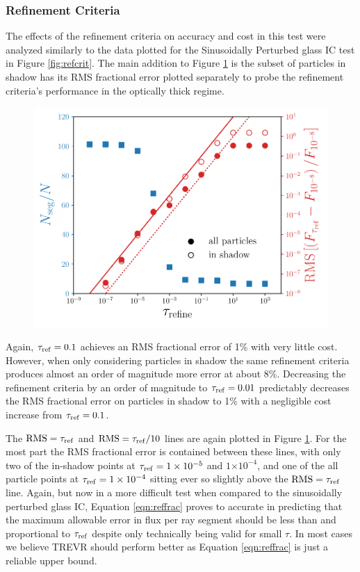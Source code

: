 \documentclass[fleq,usenatbib]{mnras}
\newcommand{\acro}{TREVR}
\providecommand{\e}[1]{\ensuremath{\times10^{#1}}}
\newcommand{\tr}{\tau_{\rm ref}}
\begin{document}
\subsubsection{Refinement Criteria}
The effects of the refinement criteria on accuracy and cost in this test were 
analyzed similarly to the data plotted for the Sinusoidally Perturbed glass IC 
test in Figure \ref{fig:refcrit}. The main addition to Figure \ref{fig:isosph} 
is the subset of particles in shadow has its RMS fractional error plotted 
separately to probe the refinement criteria's performance in the optically 
thick regime.
\begin{figure}
\includegraphics[width=1\linewidth]{Figures/isothermal_spheres.pdf}
\caption{}
\label{fig:isosph}
\end{figure}
Again, $\tr=0.1$ achieves an RMS fractional error of 1\% with very 
little cost. However, when only considering particles in shadow the same 
refinement criteria produces almost an order of magnitude more error at about 
8\%. Decreasing the refinement criteria by an order of magnitude to 
$\tr=0.01$ predictably decreases the RMS fractional error on particles in 
shadow to 1\% with a negligible cost increase from $\tr=0.1$. 

The $\rm{RMS}=\tr$ and $\rm{RMS}=\tr/10$ lines are again plotted in Figure 
\ref{fig:isosph}. For the most part the RMS fractional error is contained 
between these lines, with only two of the in-shadow points at $\tr=1\e{-5}$ 
and $1\e{-4}$,  and one of the all particle points at  $\tr=1\e{-4}$ sitting 
ever so slightly above the $\rm{RMS}=\tr$ line. Again, but now in a more 
difficult test when compared to the sinusoidally perturbed glass IC, Equation 
\ref{eqn:reffrac} proves to accurate in predicting that the maximum allowable 
error in flux per ray segment should be less than and proportional to $\tr$
despite only technically being valid for small $\tau$. In most cases we 
believe \acro{} should perform better as Equation \ref{eqn:reffrac} is just a 
reliable upper bound.
\end{document}
